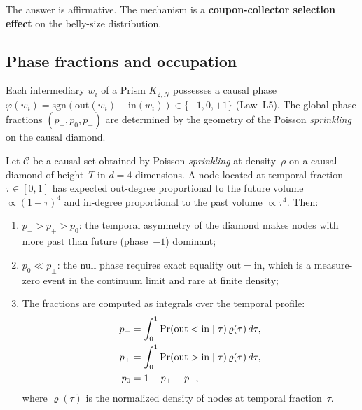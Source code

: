 The answer is affirmative. The mechanism is a \textbf{coupon-collector
selection effect} on the belly-size distribution.

\subsection{Phase fractions and occupation}

Each intermediary $w_i$ of a Prism $K_{2,N}$ possesses a causal phase
$\varphi(w_i) = \mathrm{sgn}(\mathrm{out}(w_i) - \mathrm{in}(w_i))
\in \{-1, 0, +1\}$ (Law~L5). The global phase fractions
$(p_+, p_0, p_-)$ are determined by the geometry of the
Poisson \emph{sprinkling} on the causal diamond.

\begin{theorem}
\label{thm:phase-fractions}
Let $\mathcal{C}$ be a causal set obtained by Poisson \emph{sprinkling}
at density~$\rho$ on a causal diamond of height~$T$
in $d = 4$ dimensions. A node located at temporal fraction
$\tau \in [0,1]$ has expected out-degree proportional to the
future volume $\propto (1-\tau)^4$ and in-degree proportional
to the past volume $\propto \tau^4$. Then:
\begin{enumerate}
  \item $p_- > p_+ > p_0$: the temporal asymmetry of the diamond makes
        nodes with more past than future (phase~$-1$) dominant;
  \item $p_0 \ll p_\pm$: the null phase requires exact equality
        $\mathrm{out} = \mathrm{in}$, which is a measure-zero event
        in the continuum limit and rare at finite density;
  \item The fractions are computed as integrals over the temporal
        profile:
        \begin{align}
          p_- &= \int_0^1 \Pr(\mathrm{out} < \mathrm{in} \mid \tau)
                \,\varrho(\tau)\,d\tau, \notag\\
          p_+ &= \int_0^1 \Pr(\mathrm{out} > \mathrm{in} \mid \tau)
                \,\varrho(\tau)\,d\tau, \label{eq:phase-fractions}\\
          p_0 &= 1 - p_+ - p_-, \notag
        \end{align}
        where $\varrho(\tau)$ is the normalized density of nodes
        at temporal fraction~$\tau$.
\end{enumerate}
\end{theorem}

